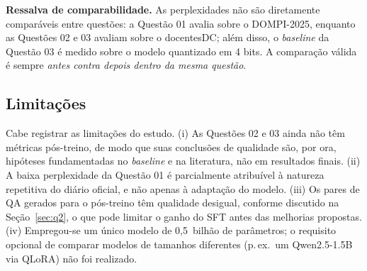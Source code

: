 \textbf{Ressalva de comparabilidade.} As perplexidades não são diretamente
comparáveis entre questões: a Questão 01 avalia sobre o DOMPI-2025, enquanto as
Questões 02 e 03 avaliam sobre o docentesDC; além disso, o \textit{baseline} da
Questão 03 é medido sobre o modelo quantizado em 4 bits. A comparação válida é sempre
\emph{antes contra depois dentro da mesma questão}.

\subsection{Limitações}

Cabe registrar as limitações do estudo. (i) As Questões 02 e 03 ainda não têm
métricas pós-treino, de modo que suas conclusões de qualidade são, por ora,
hipóteses fundamentadas no \textit{baseline} e na literatura, não em resultados
finais. (ii) A baixa perplexidade da Questão 01 é parcialmente atribuível à natureza
repetitiva do diário oficial, e não apenas à adaptação do modelo. (iii) Os pares de
QA gerados para o pós-treino têm qualidade desigual, conforme discutido na
Seção~\ref{sec:q2}, o que pode limitar o ganho do SFT antes das melhorias propostas.
(iv) Empregou-se um único modelo de 0,5~bilhão de parâmetros; o requisito opcional de
comparar modelos de tamanhos diferentes (p.\,ex.\ um Qwen2.5-1.5B via QLoRA) não foi
realizado.
